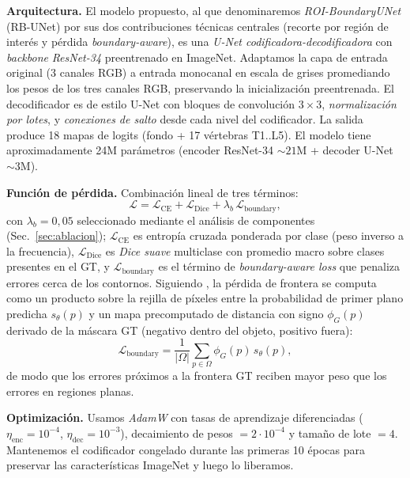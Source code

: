 \documentclass[conference]{IEEEtran}
\begin{document}
\textbf{Arquitectura.} El modelo propuesto, al que denominaremos \emph{ROI-BoundaryUNet} (RB-UNet) por sus dos contribuciones técnicas centrales (recorte por región de interés y pérdida \emph{boundary-aware}), es una \emph{U-Net codificadora-decodificadora} con \emph{backbone} \emph{ResNet-34} preentrenado en ImageNet. Adaptamos la capa de entrada original (3 canales RGB) a entrada monocanal en escala de grises promediando los pesos de los tres canales RGB, preservando la inicialización preentrenada. El decodificador es de estilo U-Net con bloques de convolución $3\times 3$, \emph{normalización por lotes}, y \emph{conexiones de salto} desde cada nivel del codificador. La salida produce 18 mapas de logits (fondo + 17 vértebras T1..L5). El modelo tiene aproximadamente 24M parámetros (encoder ResNet-34 $\sim 21$M + decoder U-Net $\sim 3$M).

\textbf{Función de pérdida.} Combinación lineal de tres términos:
\begin{equation}
\mathcal{L} = \mathcal{L}_{\text{CE}} + \mathcal{L}_{\text{Dice}} + \lambda_b \,\mathcal{L}_{\text{boundary}},
\end{equation}
con $\lambda_b = 0{,}05$ seleccionado mediante el análisis de componentes (Sec.~\ref{sec:ablacion}); $\mathcal{L}_{\text{CE}}$ es entropía cruzada ponderada por clase (peso inverso a la frecuencia), $\mathcal{L}_{\text{Dice}}$ es \emph{Dice suave} multiclase con promedio macro sobre clases presentes en el GT, y $\mathcal{L}_{\text{boundary}}$ es el término de \emph{boundary-aware loss} \cite{kervadec_boundary_2019} que penaliza errores cerca de los contornos. Siguiendo \cite{kervadec_boundary_2019}, la pérdida de frontera se computa como un producto sobre la rejilla de píxeles entre la probabilidad de primer plano predicha $s_\theta(p)$ y un mapa precomputado de distancia con signo $\phi_G(p)$ derivado de la máscara GT (negativo dentro del objeto, positivo fuera):
\begin{equation}
\mathcal{L}_{\text{boundary}} = \frac{1}{|\Omega|} \sum_{p \in \Omega} \phi_G(p) \, s_\theta(p),
\end{equation}
de modo que los errores próximos a la frontera GT reciben mayor peso que los errores en regiones planas.

\textbf{Optimización.} Usamos \emph{AdamW} con tasas de aprendizaje diferenciadas ($\eta_{\text{enc}} = 10^{-4}$, $\eta_{\text{dec}} = 10^{-3}$), decaimiento de pesos $= 2\cdot 10^{-4}$ y tamaño de lote $= 4$. Mantenemos el codificador congelado durante las primeras 10 épocas para preservar las características ImageNet y luego lo liberamos.
\end{document}
